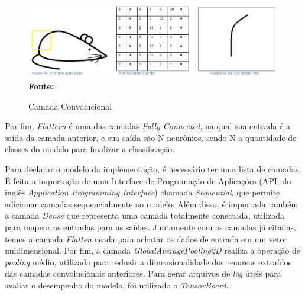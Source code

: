 \begin{figure}[ht]
 	\centering	
 	\caption[\hspace{0.1cm}Grade Computacional.]{Camada Convolucional}
 	\vspace{-0.4cm}
 	\includegraphics[width=1\textwidth]{figuras/conv.png}
 	\captionsetup{justification=centering}
	\vspace{-0.2cm}
     \\\textbf{\footnotesize Fonte: \cite{cnns}}
	\label{fig:conv2}
\end{figure}

Por fim, \textit{Flattern} é uma das camadas \textit{Fully Connected}, na qual sua entrada é a saída da camada anterior, e sua saída são N neurônios, sendo N a quantidade de classes do modelo para finalizar a classificação.


Para declarar o modelo da implementação, é necessário ter uma lista de camadas. É feita a importação de uma Interface de Programação de Aplicações (API, do inglês \textit{Application Programming Interface}) chamada \textit{Sequential}, que permite adicionar camadas sequencialmente ao modelo. Além disso, é importada também a camada \textit{Dense} que representa uma camada totalmente conectada, utilizada para mapear as entradas para as saídas. Juntamente com as camadas já citadas, temos a camada \textit{Flatten} usada para achatar os dados de entrada em um vetor unidimensional. Por fim, a camada \textit{GlobalAveragePooling2D} realiza a operação de \textit{pooling} médio, utilizada para reduzir a dimensionalidade dos recursos extraídos das camadas convolucionais anteriores. Para gerar arquivos de \textit{log} úteis para avaliar o desempenho do modelo, foi utilizado o \textit{TensorBoard}.



